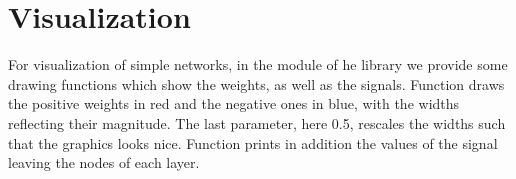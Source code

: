 \documentclass[a4paper,12pt,polish]{jupyterBook}
\begin{document}
\section{Visualization}
\label{\detokenize{docs/more_layers:visualization}}
\sphinxAtStartPar
For visualization of simple networks, in the  module of he  library we provide some drawing functions which show the weights, as well as the signals. Function  draws the positive weights in red and the negative ones in blue, with the widths reflecting their magnitude. The last parameter, here 0.5, rescales  the widths such that the graphics looks nice. Function   prints in addition the values of the signal leaving the nodes of each layer.
\begin{sphinxVerbatimInput}

\begin{sphinxVerbatim}[commandchars=\\\{\}]
\end{sphinxVerbatim}
\end{sphinxVerbatimInput}
\begin{sphinxVerbatimOutput}

\noindent{}
\end{sphinxVerbatimOutput}
\begin{sphinxVerbatimInput}

\begin{sphinxVerbatim}[commandchars=\\\{\}]
\end{sphinxVerbatim}
\end{sphinxVerbatimInput}
\begin{sphinxVerbatimOutput}

\noindent{}
\end{sphinxVerbatimOutput}
\end{document}
